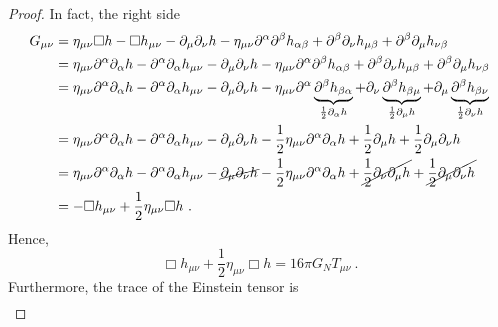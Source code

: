     \begin{proof}
        In fact, the right side 
        \begin{equation*}
        \begin{aligned}
            G_{\mu\nu} & = \eta_{\mu\nu} \Box h - \Box h_{\mu\nu} - \partial_\mu \partial_\nu h - \eta_{\mu\nu} \partial^\alpha \partial^\beta h_{\alpha\beta}  + \partial^\beta \partial_\nu h_{\mu\beta} + \partial^\beta \partial_\mu h_{\nu\beta} \\ & = \eta_{\mu\nu} \partial^\alpha \partial_\alpha h - \partial^\alpha \partial_\alpha h_{\mu\nu} - \partial_\mu \partial_\nu h - \eta_{\mu\nu} \partial^\alpha \partial^\beta h_{\alpha\beta}  + \partial^\beta \partial_\nu h_{\mu\beta} + \partial^\beta \partial_\mu h_{\nu\beta} \\ & = \eta_{\mu\nu} \partial^\alpha \partial_\alpha h - \partial^\alpha \partial_\alpha h_{\mu\nu} - \partial_\mu \partial_\nu h - \eta_{\mu\nu} \partial^\alpha \underbrace{\partial^\beta h_{\beta\alpha}}_{\frac{1}{2} \partial_\alpha h}  + \partial_\nu \underbrace{\partial^\beta h_{\beta\mu}}_{\frac{1}{2} \partial_\mu h} +  \partial_\mu \underbrace{\partial^\beta h_{\beta\nu}}_{\frac{1}{2} \partial_\nu h} \\ & = \eta_{\mu\nu} \partial^\alpha \partial_\alpha h - \partial^\alpha \partial_\alpha h_{\mu\nu} - \partial_\mu \partial_\nu h - \frac{1}{2} \eta_{\mu\nu} \partial^\alpha \partial_\alpha h  + \frac{1}{2} \partial_\mu h + \frac{1}{2} \partial_\mu \partial_\nu h \\ & = \eta_{\mu\nu} \partial^\alpha \partial_\alpha h - \partial^\alpha \partial_\alpha h_{\mu\nu} - \cancel{\partial_\mu \partial_\nu h} - \frac{1}{2} \eta_{\mu\nu} \partial^\alpha \partial_\alpha h  + \cancel{\frac{1}{2} \partial_\nu \partial_\mu h} + \cancel{\frac{1}{2} \partial_\mu \partial_\nu h } \\ & = - \Box h_{\mu\nu} + \frac{1}{2} \eta_{\mu\nu} \Box h ~.
        \end{aligned}
        \end{equation*}
        Hence,
        \begin{equation*}
            \Box h_{\mu\nu} + \frac{1}{2} \eta_{\mu\nu} \Box h = 16 \pi G_N T_{\mu\nu} ~.
        \end{equation*} 
        Furthermore, the trace of the Einstein tensor is 
        \begin{equation*}
        \begin{aligned}

\end{aligned}
\end{equation*}
\end{proof}
